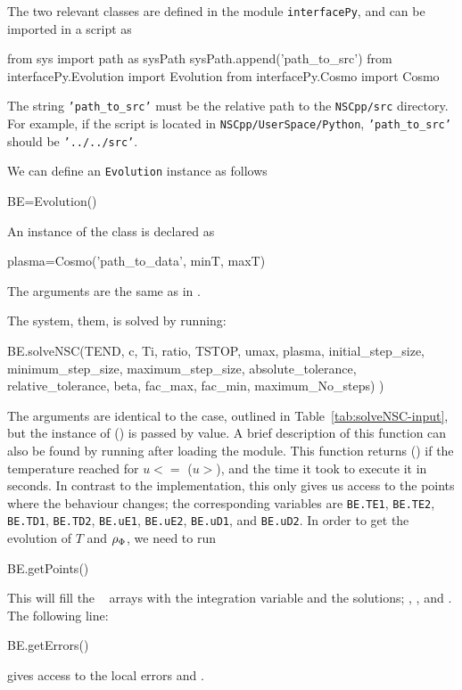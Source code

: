 \documentclass[11pt,a4paper]{article}
\begin{document}
The two relevant classes are defined in the module {\tt interfacePy}, and can be imported in a \PY script as 
%
\begin{py}
	from sys import path as sysPath
	sysPath.append('path_to_src')
	from interfacePy.Evolution import Evolution
	from interfacePy.Cosmo import Cosmo
\end{py}
%
The string {\tt 'path\_to\_src'} must be the relative path to the {\tt NSCpp/src} directory. For example, if the script is located in {\tt NSCpp/UserSpace/Python}, {\tt 'path\_to\_src'} should be {\tt '../../src'}.


We can define an {\tt Evolution} instance as follows 
%
\begin{py}
	BE=Evolution()
\end{py}

An instance of the  class is declared as 
%
\begin{cpp}
	plasma=Cosmo('path_to_data', minT, maxT)
\end{cpp}
%
The arguments are the same as in \CPP.

The system, them, is solved by running:
%
\begin{cpp}
	BE.solveNSC(TEND, c, Ti, ratio, TSTOP, umax, plasma,
						initial_step_size, minimum_step_size, maximum_step_size, absolute_tolerance, 
						relative_tolerance, beta, fac_max, fac_min, maximum_No_steps)
					  )
\end{cpp}
%
The arguments are identical to the \CPP case, outlined in Table~\ref{tab:solveNSC-input}, but the instance of  () is passed by value. A brief description of this function can also be found by running  after loading the module. This function returns  () if the temperature reached  for $u<=$ ($u>$), and the time it took to execute it in seconds.
%
In contrast to the \CPP implementation, this only gives us access to the points where the behaviour changes; the corresponding variables are {\tt BE.TE1}, {\tt BE.TE2}, {\tt BE.TD1}, {\tt BE.TD2}, {\tt BE.uE1}, {\tt BE.uE2}, {\tt BE.uD1}, and {\tt BE.uD2}. In order to get the evolution of $T$ and $\rho_{\Phi}$, we need to run 
%
\begin{py}
	BE.getPoints()
\end{py}
%
This will fill the ~\cite{harris2020array} arrays with the integration variable and the solutions; , , and . The following line:
%
\begin{py}
	BE.getErrors()
\end{py}
%
gives access to the local errors  and .
\end{document}
